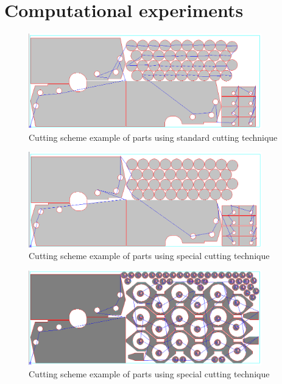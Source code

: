 \documentclass[runningheads]{llncs}
\begin{document}
\section{Computational experiments}

\begin{figure}
  \begin{center}
  \includegraphics[width=0.9\textwidth]{std.png}
  \caption{Cutting scheme example of parts using standard cutting technique}
  \label{std}
  \end{center}
\end{figure}

\begin{figure}
  \begin{center}
  \includegraphics[width=0.9\textwidth]{special.png}
  \caption{Cutting scheme example of parts using special cutting technique}
  \label{special}
  \end{center}
\end{figure}

\begin{figure}
  \begin{center}
  \includegraphics[width=0.9\textwidth]{spec-a.png}
  \caption{Cutting scheme example of parts using special cutting technique}
  \label{spec-a}
  \end{center}
\end{figure}
\end{document}
